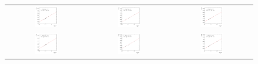 \begin{figure}[ht]
\begin{tabular}{ccc}
    \includegraphics[width=0.3\textwidth]{figures/ResFit_Spring10QCDFlat_Gauss_Eta0_ExtrapolatedPar0_PtBin4} &
    \includegraphics[width=0.3\textwidth]{figures/ResFit_Spring10QCDFlat_Gauss_Eta0_ExtrapolatedPar0_PtBin5} &
    \includegraphics[width=0.3\textwidth]{figures/ResFit_Spring10QCDFlat_Gauss_Eta0_ExtrapolatedPar0_PtBin6} \\

    \includegraphics[width=0.3\textwidth]{figures/ResFit_Spring10QCDFlat_Gauss_Eta0_ExtrapolatedPar0_PtBin7} &
    \includegraphics[width=0.3\textwidth]{figures/ResFit_Spring10QCDFlat_Gauss_Eta0_ExtrapolatedPar0_PtBin8} &
    \includegraphics[width=0.3\textwidth]{figures/ResFit_Spring10QCDFlat_Gauss_Eta0_ExtrapolatedPar0_PtBin9} \\


\end{tabular}
\end{figure}
